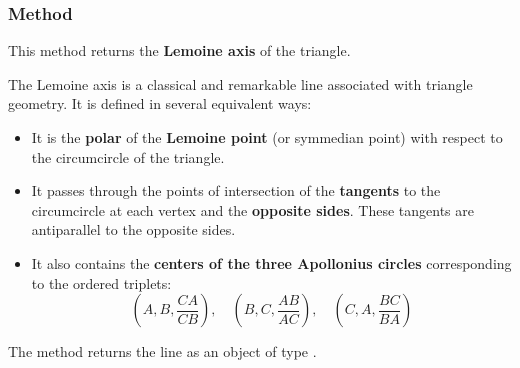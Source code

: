 \subsubsection{Method } %
\label{ssub:method_triangle_lemoine__line}

This method returns the \textbf{Lemoine axis} of the triangle.

\medskip

The Lemoine axis is a classical and remarkable line associated with triangle geometry. It is defined in several equivalent ways:
\begin{itemize}
  \item It is the \textbf{polar} of the \textbf{Lemoine point} (or symmedian point) with respect to the circumcircle of the triangle.
  \item It passes through the points of intersection of the \textbf{tangents} to the circumcircle at each vertex and the \textbf{opposite sides}. These tangents are antiparallel to the opposite sides.
  \item It also contains the \textbf{centers of the three Apollonius circles} corresponding to the ordered triplets:
  \[
    (A, B, \frac{CA}{CB}), \quad (B, C, \frac{AB}{AC}), \quad (C, A, \frac{BC}{BA})
  \]
\end{itemize}


The method  returns the line as an object of type .

\vspace{1em}

\begin{minipage}{.5\textwidth}
\begin{center}
\end{center}

\end{minipage}
\begin{minipage}{.5\textwidth}
\begin{tkzexample}
\end{tkzexample}
\end{minipage}

